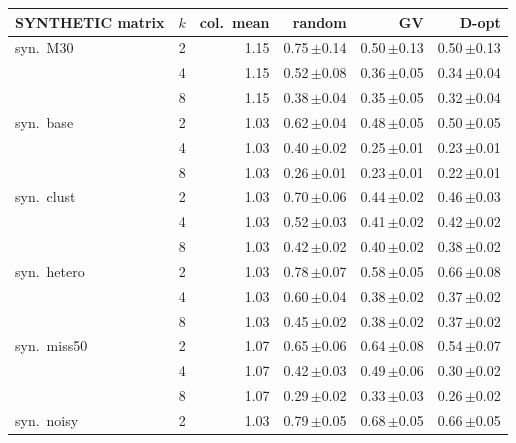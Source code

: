 \begin{tabular}{lrrrrr}
\toprule
SYNTHETIC matrix & $k$ & col.\ mean & random & GV & D-opt \\
\midrule
syn.\ M30 & 2 & 1.15 & 0.75\,{\scriptsize$\pm$0.14} & 0.50\,{\scriptsize$\pm$0.13} & 0.50\,{\scriptsize$\pm$0.13} \\
 & 4 & 1.15 & 0.52\,{\scriptsize$\pm$0.08} & 0.36\,{\scriptsize$\pm$0.05} & 0.34\,{\scriptsize$\pm$0.04} \\
 & 8 & 1.15 & 0.38\,{\scriptsize$\pm$0.04} & 0.35\,{\scriptsize$\pm$0.05} & 0.32\,{\scriptsize$\pm$0.04} \\
\midrule
syn.\ base & 2 & 1.03 & 0.62\,{\scriptsize$\pm$0.04} & 0.48\,{\scriptsize$\pm$0.05} & 0.50\,{\scriptsize$\pm$0.05} \\
 & 4 & 1.03 & 0.40\,{\scriptsize$\pm$0.02} & 0.25\,{\scriptsize$\pm$0.01} & 0.23\,{\scriptsize$\pm$0.01} \\
 & 8 & 1.03 & 0.26\,{\scriptsize$\pm$0.01} & 0.23\,{\scriptsize$\pm$0.01} & 0.22\,{\scriptsize$\pm$0.01} \\
\midrule
syn.\ clust & 2 & 1.03 & 0.70\,{\scriptsize$\pm$0.06} & 0.44\,{\scriptsize$\pm$0.02} & 0.46\,{\scriptsize$\pm$0.03} \\
 & 4 & 1.03 & 0.52\,{\scriptsize$\pm$0.03} & 0.41\,{\scriptsize$\pm$0.02} & 0.42\,{\scriptsize$\pm$0.02} \\
 & 8 & 1.03 & 0.42\,{\scriptsize$\pm$0.02} & 0.40\,{\scriptsize$\pm$0.02} & 0.38\,{\scriptsize$\pm$0.02} \\
\midrule
syn.\ hetero & 2 & 1.03 & 0.78\,{\scriptsize$\pm$0.07} & 0.58\,{\scriptsize$\pm$0.05} & 0.66\,{\scriptsize$\pm$0.08} \\
 & 4 & 1.03 & 0.60\,{\scriptsize$\pm$0.04} & 0.38\,{\scriptsize$\pm$0.02} & 0.37\,{\scriptsize$\pm$0.02} \\
 & 8 & 1.03 & 0.45\,{\scriptsize$\pm$0.02} & 0.38\,{\scriptsize$\pm$0.02} & 0.37\,{\scriptsize$\pm$0.02} \\
\midrule
syn.\ miss50 & 2 & 1.07 & 0.65\,{\scriptsize$\pm$0.06} & 0.64\,{\scriptsize$\pm$0.08} & 0.54\,{\scriptsize$\pm$0.07} \\
 & 4 & 1.07 & 0.42\,{\scriptsize$\pm$0.03} & 0.49\,{\scriptsize$\pm$0.06} & 0.30\,{\scriptsize$\pm$0.02} \\
 & 8 & 1.07 & 0.29\,{\scriptsize$\pm$0.02} & 0.33\,{\scriptsize$\pm$0.03} & 0.26\,{\scriptsize$\pm$0.02} \\
\midrule
syn.\ noisy & 2 & 1.03 & 0.79\,{\scriptsize$\pm$0.05} & 0.68\,{\scriptsize$\pm$0.05} & 0.66\,{\scriptsize$\pm$0.05} \\

\end{tabular}
